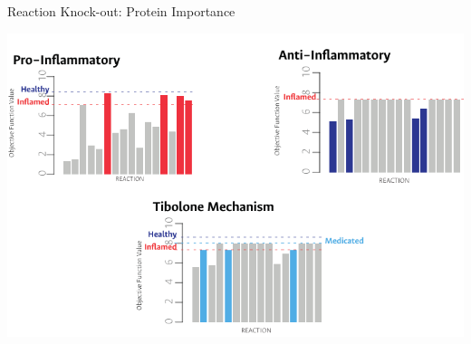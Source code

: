 \documentclass[11pt]{beamer}
\begin{document}
\begin{frame}{Reaction Knock-out: Protein Importance}
\begin{center}
\includegraphics[width=\textwidth]{Networks}
\end{center}
\end{frame}
\end{document}

